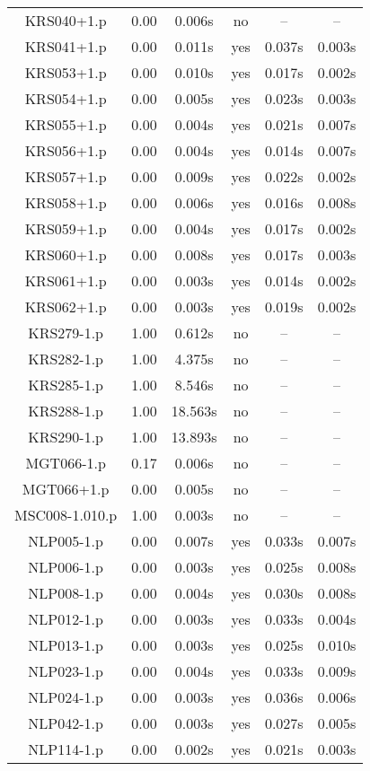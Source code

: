 \begin{center}
\begin{longtable}{||c | c | c | c | c | c||}
KRS040+1.p & 0.00 & 0.006s & no & -- & -- \\
KRS041+1.p & 0.00 & 0.011s & yes & 0.037s & 0.003s \\
KRS053+1.p & 0.00 & 0.010s & yes & 0.017s & 0.002s \\
KRS054+1.p & 0.00 & 0.005s & yes & 0.023s & 0.003s \\
KRS055+1.p & 0.00 & 0.004s & yes & 0.021s & 0.007s \\
KRS056+1.p & 0.00 & 0.004s & yes & 0.014s & 0.007s \\
KRS057+1.p & 0.00 & 0.009s & yes & 0.022s & 0.002s \\
KRS058+1.p & 0.00 & 0.006s & yes & 0.016s & 0.008s \\
KRS059+1.p & 0.00 & 0.004s & yes & 0.017s & 0.002s \\
KRS060+1.p & 0.00 & 0.008s & yes & 0.017s & 0.003s \\
KRS061+1.p & 0.00 & 0.003s & yes & 0.014s & 0.002s \\
KRS062+1.p & 0.00 & 0.003s & yes & 0.019s & 0.002s \\
KRS279-1.p & 1.00 & 0.612s & no & -- & -- \\
KRS282-1.p & 1.00 & 4.375s & no & -- & -- \\
KRS285-1.p & 1.00 & 8.546s & no & -- & -- \\
KRS288-1.p & 1.00 & 18.563s & no & -- & -- \\
KRS290-1.p & 1.00 & 13.893s & no & -- & -- \\
MGT066-1.p & 0.17 & 0.006s & no & -- & -- \\
MGT066+1.p & 0.00 & 0.005s & no & -- & -- \\
MSC008-1.010.p & 1.00 & 0.003s & no & -- & -- \\
NLP005-1.p & 0.00 & 0.007s & yes & 0.033s & 0.007s \\
NLP006-1.p & 0.00 & 0.003s & yes & 0.025s & 0.008s \\
NLP008-1.p & 0.00 & 0.004s & yes & 0.030s & 0.008s \\
NLP012-1.p & 0.00 & 0.003s & yes & 0.033s & 0.004s \\
NLP013-1.p & 0.00 & 0.003s & yes & 0.025s & 0.010s \\
NLP023-1.p & 0.00 & 0.004s & yes & 0.033s & 0.009s \\
NLP024-1.p & 0.00 & 0.003s & yes & 0.036s & 0.006s \\
NLP042-1.p & 0.00 & 0.003s & yes & 0.027s & 0.005s \\
NLP114-1.p & 0.00 & 0.002s & yes & 0.021s & 0.003s \\

\end{longtable}
\end{center}
